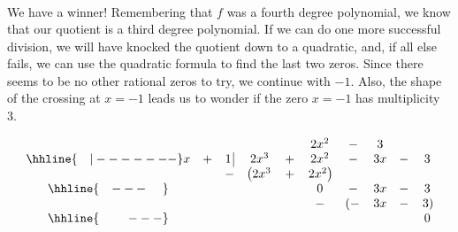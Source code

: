 {\begin{enumerate}
{\[\begin{array}{ccccccccccccc}
 \end{array}\]
 
\setlength\arraycolsep{5pt}
\setlength\extrarowheight{0pt}

}
We have a winner!  Remembering that $f$ was a fourth degree polynomial, we know that our quotient is a third degree polynomial.  If we can do one more successful division, we will have knocked the quotient down to a quadratic, and, if all else fails, we can use the quadratic formula to find the last two zeros.  Since there seems to be no other rational zeros to try, we continue with $-1$.  Also, the shape of the crossing at $x = -1$ leads us to wonder if the zero $x = -1$ has multiplicity 3.

{

\setlength\arraycolsep{0.1pt}
\setlength\extrarowheight{2pt}

\[ \begin{array}{cccccccccc}

& & & & & 2x^2 & - & 3 &  &  \\ \hhline{~~~|-------}

x & + & 1 \, \vline& 2x^3 & + & 2x^2 & - & 3x & - & 3\\

 &  &  -& \left(2x^3 \right. & + & \left.  2x^2\right) &  &  &  &  \\ \hhline{~~~---~~~~} 
 &  &  &   &   & 0 & - & 3x  & - & 3 \\ 
 &  &  &   &   & - & \left(-\right. & 3x & - & \left.3\right) \\  \hhline{~~~~~~~---} 
 &   &  &  &  &  &  &  &  & 0
 

\end{array}\]}
\end{enumerate}}
